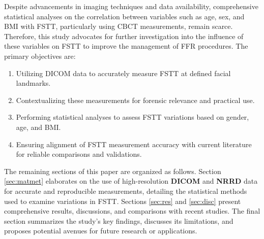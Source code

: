 \documentclass[journal,article,submit,pdftex,moreauthors]{Definitions/mdpi}
\begin{document}
Despite advancements in imaging techniques and data availability, comprehensive statistical analyses on the correlation between variables such as age, sex, and BMI with FSTT, particularly using CBCT measurements, remain scarce. %
Therefore, this study advocates for further investigation into the influence of these variables on FSTT to improve the management of FFR procedures. The primary objectives are:

\begin{enumerate}
    \item Utilizing DICOM data to accurately measure FSTT at defined facial landmarks.
    
    \item Contextualizing these measurements for forensic relevance and practical use.
    
    \item Performing statistical analyses to assess FSTT variations based on gender, age, and BMI.
    
    \item Ensuring alignment of FSTT measurement accuracy with current literature for reliable comparisons and validations.
\end{enumerate}

The remaining sections of this paper are organized as follows. Section \ref{sec:matmet} elaborates on the use of high-resolution \textbf{DICOM} and \textbf{NRRD} data for accurate and reproducible measurements, detailing the statistical methods used to examine variations in FSTT. Sections \ref{sec:res} and \ref{sec:disc} present comprehensive results, discussions, and comparisons with recent studies. The final section summarizes the study's key findings, discusses its limitations, and proposes potential avenues for future research or applications.
\end{document}
